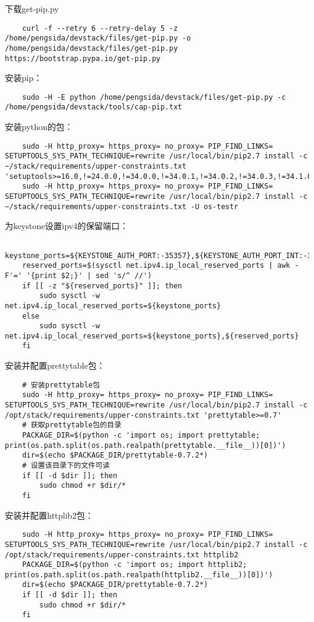 \documentclass[a4paper,left=1.5cm,right=1.5cm,11pt]{article}
\begin{document}
	下载get-pip.py
	\begin{lstlisting}
	curl -f --retry 6 --retry-delay 5 -z /home/pengsida/devstack/files/get-pip.py -o /home/pengsida/devstack/files/get-pip.py https://bootstrap.pypa.io/get-pip.py
	\end{lstlisting}

	安装pip：
	\begin{lstlisting}
	sudo -H -E python /home/pengsida/devstack/files/get-pip.py -c /home/pengsida/devstack/tools/cap-pip.txt
	\end{lstlisting}

	安装python的包：
	\begin{lstlisting}
	sudo -H http_proxy= https_proxy= no_proxy= PIP_FIND_LINKS= SETUPTOOLS_SYS_PATH_TECHNIQUE=rewrite /usr/local/bin/pip2.7 install -c ~/stack/requirements/upper-constraints.txt 'setuptools>=16.0,!=24.0.0,!=34.0.0,!=34.0.1,!=34.0.2,!=34.0.3,!=34.1.0,!=34.1.1,!=34.2.0,!=34.3.0,!=34.3.1,!=34.3.2'
	sudo -H http_proxy= https_proxy= no_proxy= PIP_FIND_LINKS= SETUPTOOLS_SYS_PATH_TECHNIQUE=rewrite /usr/local/bin/pip2.7 install -c ~/stack/requirements/upper-constraints.txt -U os-testr
	\end{lstlisting}

	为keystone设置ipv4的保留端口：
	\begin{lstlisting}
	keystone_ports=${KEYSTONE_AUTH_PORT:-35357},${KEYSTONE_AUTH_PORT_INT:-35358}
	reserved_ports=$(sysctl net.ipv4.ip_local_reserved_ports | awk -F'=' '{print $2;}' | sed 's/^ //')
	if [[ -z "${reserved_ports}" ]]; then
        sudo sysctl -w net.ipv4.ip_local_reserved_ports=${keystone_ports}
    else
        sudo sysctl -w net.ipv4.ip_local_reserved_ports=${keystone_ports},${reserved_ports}
    fi
	\end{lstlisting}

	安装并配置prettytable包：
	\begin{lstlisting}
	# 安装prettytable包
	sudo -H http_proxy= https_proxy= no_proxy= PIP_FIND_LINKS= SETUPTOOLS_SYS_PATH_TECHNIQUE=rewrite /usr/local/bin/pip2.7 install -c /opt/stack/requirements/upper-constraints.txt 'prettytable>=0.7'
	# 获取prettytable包的目录
	PACKAGE_DIR=$(python -c 'import os; import prettytable; print(os.path.split(os.path.realpath(prettytable.__file__))[0])')
	dir=$(echo $PACKAGE_DIR/prettytable-0.7.2*)
	# 设置该目录下的文件可读
	if [[ -d $dir ]]; then
		sudo chmod +r $dir/*
	fi
	\end{lstlisting}

	安装并配置httplib2包：
	\begin{lstlisting}
	sudo -H http_proxy= https_proxy= no_proxy= PIP_FIND_LINKS= SETUPTOOLS_SYS_PATH_TECHNIQUE=rewrite /usr/local/bin/pip2.7 install -c /opt/stack/requirements/upper-constraints.txt httplib2
	PACKAGE_DIR=$(python -c 'import os; import httplib2; print(os.path.split(os.path.realpath(httplib2.__file__))[0])')
	dir=$(echo $PACKAGE_DIR/prettytable-0.7.2*)
	if [[ -d $dir ]]; then
		sudo chmod +r $dir/*
	fi
	\end{lstlisting}
\end{document}
